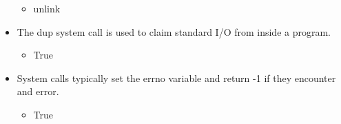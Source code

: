 \documentclass{report}
\begin{document}
\begin{itemize}
\begin{itemize}
                \item unlink
            \end{itemize}
        \item The dup system call is used to claim standard I/O from inside a program.
            \begin{itemize}
                \item True
            \end{itemize}
        \item System calls typically set the errno variable and return -1 if they encounter and error.
            \begin{itemize}
                \item True
            \end{itemize}





       
    \end{itemize}
\end{document}
